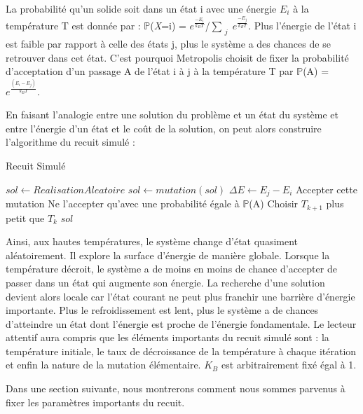 \documentclass{article}%
\begin{document}
	La probabilité qu'un solide soit dans un état i avec une énergie $E_i$ à la température T est donnée par : $\mathbb{P}$(\emph{X}=i) = $e^{\frac{-E_i}{k_BT}}$/$\sum_{\substack{j}}$$e^{\frac{-E_j}{k_BT}}$. Plus l'énergie de l'état i est faible par rapport à celle des états j, plus le système a des chances de se retrouver dans cet état. C'est pourquoi Metropolis choisit de fixer la probabilité d'acceptation d'un passage A de l'état i à j à la température T par $\mathbb{P}$(A) = $e^\frac{(E_i-E_j)}{k_BT}$.
	
	\vspace{1cm}
	
	En faisant l'analogie entre une solution du problème et un état du système et entre l'énergie d'un état et le coût de la solution, on peut alors construire l'algorithme du recuit simulé :
	
	\begin{algorithm} 
	\caption{Recuit Simulé}
	\begin{algorithmic}
	
	\STATE $sol \leftarrow RealisationAleatoire$
		\STATE $sol \leftarrow mutation( sol ) $
		\STATE $\Delta{E} \leftarrow E_j-E_i$
			\STATE Accepter cette mutation	
		\ELSE 
			\STATE Ne l'accepter qu'avec une probabilité égale à $\mathbb{P}$(A)
		\ENDIF
		\STATE Choisir $T_{k+1}$ plus petit que $T_{k}$
	\ENDFOR
	\RETURN $sol$
	\end{algorithmic}
	\end{algorithm}
\vspace{1cm}

Ainsi, aux hautes températures, le système change d'état quasiment aléatoirement. Il explore la surface d'énergie de manière globale. Lorsque la température décroit, le système a de moins en moins de chance d'accepter de passer dans un état qui augmente son énergie. La recherche d'une solution devient alors locale car l'état courant ne peut plus franchir une barrière d'énergie importante. Plus le refroidissement est lent, plus le système a de chances d'atteindre un état dont l'énergie est proche de l'énergie fondamentale. Le lecteur attentif aura compris que les éléments importants du recuit simulé sont : la température initiale, le taux de décroissance de la température à chaque itération et enfin la nature de la mutation élémentaire. $K_B$ est arbitrairement fixé égal à 1.

Dans une section suivante, nous montrerons comment nous sommes parvenus à fixer les paramètres importants du recuit.
\end{document}
